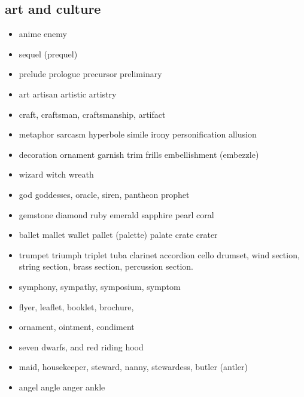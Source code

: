 \documentclass[a4paper,11pt,twoside]{book}
\begin{document}
\subsection{art and culture}
\begin{itemize}
	\item anime enemy
	\item sequel (prequel) 
	
	\item prelude prologue precursor preliminary 
	
	\item art artisan artistic artistry
	
	\item craft, craftsman, craftsmanship, artifact

	\item metaphor sarcasm hyperbole simile irony personification allusion 
	
	\item decoration ornament garnish trim frills embellishment (embezzle)
	
	\item wizard witch wreath 	
	
	\item god goddesses, oracle, siren, pantheon prophet
	
	\item gemstone diamond ruby emerald sapphire pearl coral
	
	\item ballet mallet wallet pallet (palette) palate crate crater
	
	\item trumpet triumph triplet tuba clarinet accordion cello drumset, wind section, string section, brass section, percussion section. 
	
	\item symphony, sympathy, symposium, symptom
	
	\item flyer, leaflet, booklet, brochure,
	
	\item ornament, ointment, condiment
	
	\item seven dwarfs, and red riding hood
	
	\item maid, housekeeper, steward, nanny, stewardess, butler (antler)
	
	\item angel angle anger ankle
	

\end{itemize}
\end{document}

